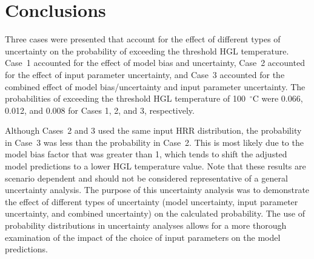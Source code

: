 \documentclass[12pt]{article}
\begin{document}
\clearpage


\section{Conclusions}
\label{sec:conclusions}

Three cases were presented that account for the effect of different types of uncertainty on the probability of exceeding the threshold HGL temperature. Case~1 accounted for the effect of model bias and uncertainty, Case~2 accounted for the effect of input parameter uncertainty, and Case~3 accounted for the combined effect of model bias/uncertainty and input parameter uncertainty. The probabilities of exceeding the threshold HGL temperature of 100~$^\circ$C were 0.066, 0.012, and 0.008 for Cases 1, 2, and 3, respectively.

Although Cases~2 and 3 used the same input HRR distribution, the probability in Case~3 was less than the probability in Case~2. This is most likely due to the model bias factor that was greater than 1, which tends to shift the adjusted model predictions to a lower HGL temperature value. Note that these results are scenario dependent and should not be considered representative of a general uncertainty analysis. The purpose of this uncertainty analysis was to demonstrate the effect of different types of uncertainty (model uncertainty, input parameter uncertainty, and combined uncertainty) on the calculated probability. The use of probability distributions in uncertainty analyses allows for a more thorough examination of the impact of the choice of input parameters on the model predictions.




\end{document}
